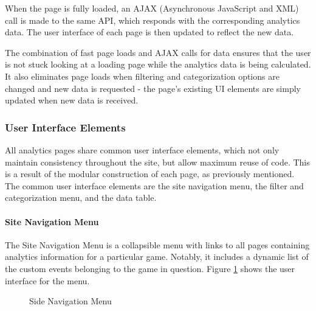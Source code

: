 When the page is fully loaded, an AJAX (Asynchronous JavaScript and XML) call is made to the same API, which responds with the corresponding analytics data. The user interface of each page is then updated to reflect the new data. 

The combination of fast page loads and AJAX calls for data ensures that the user is not stuck looking at a loading page while the analytics data is being calculated. It also eliminates page loads when filtering and categorization options are changed and new data is requested - the page's existing UI elements are simply updated when new data is received.

\subsubsection{User Interface Elements}

All analytics pages share common user interface elements, which not only maintain consistency throughout the site, but allow maximum reuse of code. This is a result of the modular construction of each page, as previously mentioned. The common user interface elements are the site navigation menu, the filter and categorization menu, and the data table. 

\paragraph{Site Navigation Menu}

The Site Navigation Menu is a collapsible menu with links to all pages containing analytics information for a particular game. Notably, it includes a dynamic list of the custom events belonging to the game in question. Figure \ref{fig:nav_menu} shows the user interface for the menu.

\begin{figure}[htb]
	\caption[Analytics Site: Side Navigation Menu]{\label{fig:nav_menu} Side Navigation Menu}
\end{figure}

